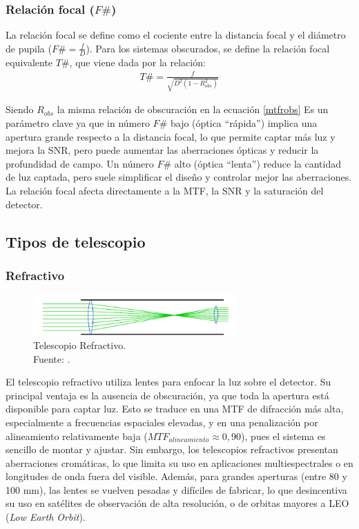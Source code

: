 \subsubsection*{Relación focal ($F\#$)}

La relación focal se define como el cociente entre la distancia focal y el diámetro de pupila ($F\#=\frac{f}{D}$). Para los sistemas obscurados, se define la relación focal equivalente $T\#$, que viene dada por la relación:
\begin{align}
\label{relfoc}
    T\# = \frac{f}{\sqrt{D^2(1-R_{obs}^2)}} 
\end{align}

Siendo $R_{obs}$ la misma relación de obscuración en la ecuación \ref{mtfrobs}
Es un parámetro clave ya que in número $F\#$ bajo (óptica “rápida”) implica una apertura grande respecto a la distancia focal, lo que permite captar más luz y mejora la SNR, pero puede aumentar las aberraciones ópticas y reducir la profundidad de campo. Un número $F\#$ alto (óptica “lenta”) reduce la cantidad de luz captada, pero suele simplificar el diseño y controlar mejor las aberraciones. La relación focal afecta directamente a la MTF, la SNR y la saturación del detector.


\subsection{Tipos de telescopio}


\subsubsection{Refractivo}

\begin{figure}[H]
    \centering
    \includegraphics[width=0.7\textwidth]{3.Conceptos_Previos/refractor-vs-reflector-4239218127.png}
    \caption{Telescopio Refractivo. \\ Fuente: \cite{refractor_reflector_comparison}.}
    \label{fig:Refractive}
\end{figure}

El telescopio refractivo utiliza lentes para enfocar la luz sobre el detector. Su principal ventaja es la ausencia de obscuración, ya que toda la apertura está disponible para captar luz. Esto se traduce en una MTF de difracción más alta, especialmente a frecuencias espaciales elevadas, y en una penalización por alineamiento relativamente baja ($MTF_{alineamiento} \approx 0,90$), pues el sistema es sencillo de montar y ajustar. Sin embargo, los telescopios refractivos presentan aberraciones cromáticas, lo que limita su uso en aplicaciones multiespectrales o en longitudes de onda fuera del visible. Además, para grandes aperturas (entre 80 y 100 mm), las lentes se vuelven pesadas y difíciles de fabricar, lo que desincentiva su uso en satélites de observación de alta resolución, o de orbitas mayores a LEO (\textit{Low Earth Orbit}).


